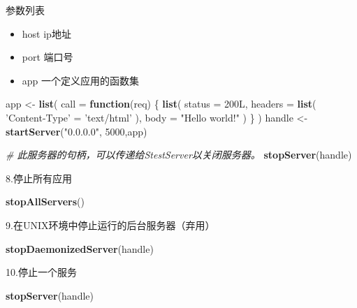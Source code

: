 \documentclass[]{book}
\newenvironment{Shaded}{\begin{snugshade}}{\end{snugshade}}
\newcommand{\KeywordTok}[1]{\textcolor[rgb]{0.13,0.29,0.53}{\textbf{#1}}}
\newcommand{\DataTypeTok}[1]{\textcolor[rgb]{0.13,0.29,0.53}{#1}}
\newcommand{\DecValTok}[1]{\textcolor[rgb]{0.00,0.00,0.81}{#1}}
\newcommand{\StringTok}[1]{\textcolor[rgb]{0.31,0.60,0.02}{#1}}
\newcommand{\CommentTok}[1]{\textcolor[rgb]{0.56,0.35,0.01}{\textit{#1}}}
\newcommand{\ControlFlowTok}[1]{\textcolor[rgb]{0.13,0.29,0.53}{\textbf{#1}}}
\newcommand{\NormalTok}[1]{#1}
\begin{document}
参数列表

\begin{itemize}
\item
  host ip地址
\item
  port 端口号
\item
  app 一个定义应用的函数集
\end{itemize}

\begin{Shaded}
\begin{Highlighting}[]

\NormalTok{app <-}\StringTok{ }\KeywordTok{list}\NormalTok{(}
  \DataTypeTok{call =} \ControlFlowTok{function}\NormalTok{(req) \{}
    \KeywordTok{list}\NormalTok{(}
      \DataTypeTok{status =}\NormalTok{ 200L,}
      \DataTypeTok{headers =} \KeywordTok{list}\NormalTok{(}
        \StringTok{'Content-Type'}\NormalTok{ =}\StringTok{ 'text/html'}
\NormalTok{        ),}
      \DataTypeTok{body =} \StringTok{"Hello world!"}
\NormalTok{    )}
\NormalTok{    \}}
\NormalTok{  )}
\NormalTok{handle <-}\StringTok{ }\KeywordTok{startServer}\NormalTok{(}\StringTok{"0.0.0.0"}\NormalTok{, }\DecValTok{5000}\NormalTok{,app)}

\CommentTok{# 此服务器的句柄，可以传递给StestServer以关闭服务器。}
\KeywordTok{stopServer}\NormalTok{(handle)}
\end{Highlighting}
\end{Shaded}

8.停止所有应用

\begin{Shaded}
\begin{Highlighting}[]
\KeywordTok{stopAllServers}\NormalTok{()}
\end{Highlighting}
\end{Shaded}

9.在UNIX环境中停止运行的后台服务器（弃用）

\begin{Shaded}
\begin{Highlighting}[]
\KeywordTok{stopDaemonizedServer}\NormalTok{(handle)}
\end{Highlighting}
\end{Shaded}

10.停止一个服务

\begin{Shaded}
\begin{Highlighting}[]
\KeywordTok{stopServer}\NormalTok{(handle)}
\end{Highlighting}
\end{Shaded}
\end{document}
